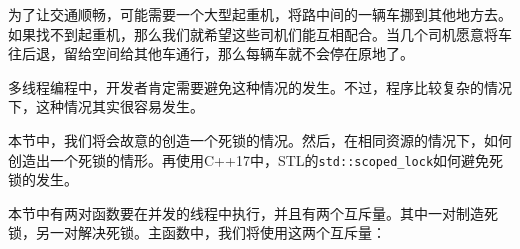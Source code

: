 
为了让交通顺畅，可能需要一个大型起重机，将路中间的一辆车挪到其他地方去。如果找不到起重机，那么我们就希望这些司机们能互相配合。当几个司机愿意将车往后退，留给空间给其他车通行，那么每辆车就不会停在原地了。

多线程编程中，开发者肯定需要避免这种情况的发生。不过，程序比较复杂的情况下，这种情况其实很容易发生。

本节中，我们将会故意的创造一个死锁的情况。然后，在相同资源的情况下，如何创造出一个死锁的情形。再使用C++17中，STL的\texttt{std::scoped\_lock}如何避免死锁的发生。


本节中有两对函数要在并发的线程中执行，并且有两个互斥量。其中一对制造死锁，另一对解决死锁。主函数中，我们将使用这两个互斥量：

